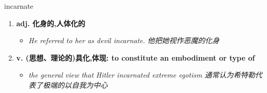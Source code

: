 
\begin{frame}
{\huge incarnate}
\begin{center}
\begin{enumerate}\Large
  \item \textbf{adj. 化身的,人体化的}
  \begin{itemize}
    \item \em{\Large{He referred to her as devil incarnate. 他把她视作恶魔的化身}}
  \end{itemize}
  \item \textbf{v. (思想、理论的)具化,体现: to constitute an embodiment or type of}
  \begin{itemize}
    \item \em{\Large{the general view that Hitler incarnated extreme egotism 通常认为希特勒代表了极端的以自我为中心}}
  \end{itemize}
\end{enumerate}
\end{center}
\end{frame}
